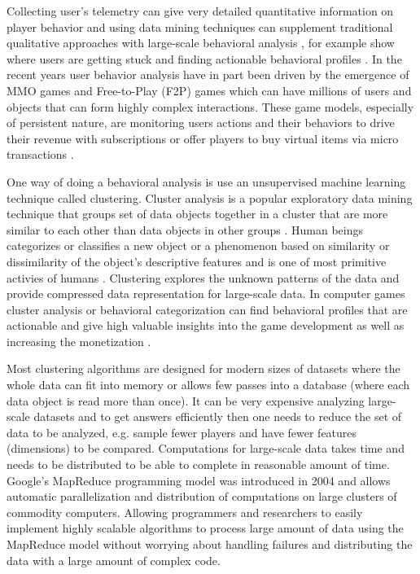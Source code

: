 Collecting user's telemetry can give very detailed quantitative information on player behavior and using data mining techniques can supplement traditional qualitative approaches with large-scale behavioral analysis \citep{Yannakakis:2012}, for example show where users are getting stuck and finding actionable behavioral profiles \citep{Kim:2008Tracking, Drachen:2012, Drachen:2011Evaluating}. In the recent years user behavior analysis have in part been driven by the emergence of MMO games and Free-to-Play (F2P) games which can have millions of users and objects that can form highly complex interactions. These game models, especially of persistent nature, are monitoring users actions and their behaviors to drive their revenue with subscriptions or offer players to buy virtual items via micro transactions \citep{Kim:2008Tracking, Drachen:2011Evaluating, Fields:2011SocialGame, Seif:2013GameAnalytics}. 

One way of doing a behavioral analysis is use an unsupervised machine learning technique called clustering. Cluster analysis is a popular exploratory data mining technique that groups set of data objects together in a cluster that are more similar to each other than data objects in other groups \citep{Xu:2005Clustering}. Human beings categorizes or classifies a new object or a phenomenon based on similarity or dissimilarity of the object's descriptive features and is one of most primitive activies of humans \citep{Anderberg:1973ClusterAnalysis}. Clustering explores the unknown patterns of the data and provide compressed data representation for large-scale data. In computer games cluster analysis or behavioral categorization can find behavioral profiles that are actionable and give high valuable insights into the game development as well as increasing the monetization \cite{Drachen:2009Tomb, Mahlmann:2010Tomb}. 

Most clustering algorithms are designed for modern sizes of datasets where the whole data can fit into memory or allows few passes into a database (where each data object is read more than once). It can be very expensive analyzing large-scale datasets and to get answers efficiently then one needs to reduce the set of data to be analyzed, e.g. sample fewer players and have fewer features (dimensions) to be compared. Computations for large-scale data takes time and needs to be distributed to be able to complete in reasonable amount of time. Google's MapReduce programming model was introduced in 2004 \citep{Dean:2004} and allows automatic parallelization and distribution of computations on large clusters of commodity computers. Allowing programmers and researchers to easily implement highly scalable algorithms to process large amount of data using the MapReduce model without worrying about handling failures and distributing the data with a large amount of complex code. 


